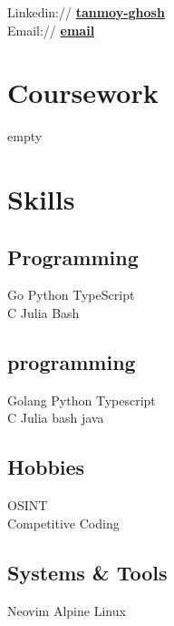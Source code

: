 \documentclass[]{deedy-resume-openfont}
\begin{document}
\begin{minipage}[t]{0.33\textwidth}
Linkedin:// \href{https://www.linkedin.com/in/tanmoy-ghosh-b94185368/}{\bf tanmoy-ghosh} \\
Email:// \href{mailto:public_profile.barbell221@passinbox.com}{\bf email}

\section{Coursework}
empty
\sectionsep

\section{Skills}
\subsection{Programming}
Go \textbullet{} Python \textbullet{} TypeScript \\
C \textbullet{} Julia \textbullet{} Bash
\sectionsep

\subsection{programming}
Golang \textbullet{} Python \textbullet{} Typescript \\
C \textbullet{} Julia \textbullet{} bash \textbullet{} java

\sectionsep

\subsection{Hobbies}
OSINT \\
Competitive Coding
\sectionsep

\subsection{Systems \& Tools}
Neovim \textbullet{} Alpine Linux
\sectionsep

\end{minipage}
\hfill
\end{document}
